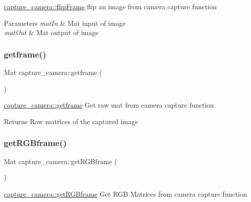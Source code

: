 \mbox{\hyperlink{classcapture__camera_a4c624aa08561057ba402c8728f7693c5}{capture\+\_\+camera\+::flip\+Frame}} flip an image from camera capture function 


\begin{DoxyParams}{Parameters}
{\em mat\+In} & Mat input of image \\
\hline
{\em mat\+Out} & Mat output of image \\
\hline
\end{DoxyParams}
\mbox{\label{classcapture__camera_ac0efa824fd11a5e77ff11114c5e6d0bc}} 
\subsubsection{\texorpdfstring{getframe()}{getframe()}}
{\footnotesize\ttfamily Mat capture\+\_\+camera\+::getframe (\begin{DoxyParamCaption}{ }\end{DoxyParamCaption})}



\mbox{\hyperlink{classcapture__camera_ac0efa824fd11a5e77ff11114c5e6d0bc}{capture\+\_\+camera\+::getframe}} Get raw mat from camera capture function 

\begin{DoxyReturn}{Returns}
Raw matrices of the captured image 
\end{DoxyReturn}
\mbox{\label{classcapture__camera_a65e6760360f14c149612f2280aed23dc}} 
\subsubsection{\texorpdfstring{get\+R\+G\+Bframe()}{getRGBframe()}}
{\footnotesize\ttfamily Mat capture\+\_\+camera\+::get\+R\+G\+Bframe (\begin{DoxyParamCaption}{ }\end{DoxyParamCaption})}



\mbox{\hyperlink{classcapture__camera_a65e6760360f14c149612f2280aed23dc}{capture\+\_\+camera\+::get\+R\+G\+Bframe}} Get R\+GB Matrices from camera capture function 

